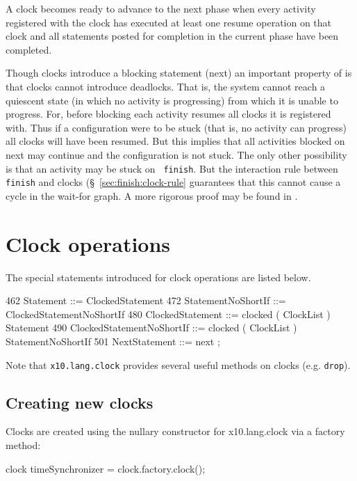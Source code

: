 A clock becomes ready to advance to the next phase when every activity
registered with the clock has executed at least one {\cf resume}
operation on that clock and all statements posted for completion in
the current phase have been completed.

Though clocks introduce a blocking statement ({\cf next}) an important
property of \Xten{} is that clocks cannot introduce deadlocks. That
is, the system cannot reach a quiescent state (in which no activity is
progressing) from which it is unable to progress. For, before blocking
each activity resumes all clocks it is registered with. Thus if a
configuration were to be stuck (that is, no activity can progress) all
clocks will have been resumed. But this implies that all activities
blocked on {\cf next} may continue and the configuration is not stuck.
The only other possibility is that an activity may be stuck on {\tt
finish}. But the interaction rule between {\tt finish} and clocks
(\S~\ref{sec:finish:clock-rule} guarantees that this cannot cause a cycle
in the wait-for graph. A more rigorous proof may be found in \cite{Xten-concur05}.

\section{Clock operations}\label{sec:clock}
The special statements introduced for clock operations are listed below.
\begin{x10}
462 Statement ::= ClockedStatement
472 StatementNoShortIf ::= 
      ClockedStatementNoShortIf
480 ClockedStatement ::= 
      clocked ( ClockList ) Statement
490 ClockedStatementNoShortIf ::= 
      clocked ( ClockList ) 
         StatementNoShortIf
501 NextStatement ::= next ;
\end{x10}

Note that {\tt x10.lang.clock} provides several useful methods on
clocks (e.g. {\tt drop}).

\subsection{Creating new clocks}\label{sec:clock:create}
Clocks are created using the nullary constructor for {\cf
x10.lang.clock} via a factory method:

\begin{x10}
clock timeSynchronizer = clock.factory.clock();
\end{x10}


